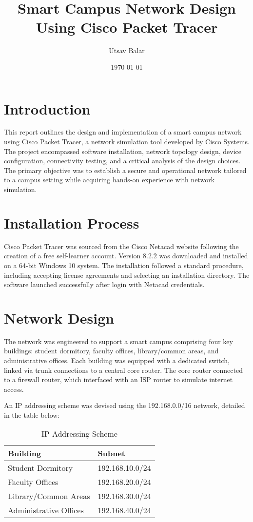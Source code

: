 \documentclass{article}
\title{Smart Campus Network Design Using Cisco Packet Tracer}
\author{Utsav Balar} %
\date{\today} %
\begin{document}
\maketitle

\section{Introduction}
This report outlines the design and implementation of a smart campus network using Cisco Packet Tracer, a network simulation tool developed by Cisco Systems. The project encompassed software installation, network topology design, device configuration, connectivity testing, and a critical analysis of the design choices. The primary objective was to establish a secure and operational network tailored to a campus setting while acquiring hands-on experience with network simulation.

\section{Installation Process}
Cisco Packet Tracer was sourced from the Cisco Netacad website following the creation of a free self-learner account. Version 8.2.2 was downloaded and installed on a 64-bit Windows 10 system. The installation followed a standard procedure, including accepting license agreements and selecting an installation directory. The software launched successfully after login with Netacad credentials.

\section{Network Design}
The network was engineered to support a smart campus comprising four key buildings: student dormitory, faculty offices, library/common areas, and administrative offices. Each building was equipped with a dedicated switch, linked via trunk connections to a central core router. The core router connected to a firewall router, which interfaced with an ISP router to simulate internet access.

An IP addressing scheme was devised using the 192.168.0.0/16 network, detailed in the table below:

\begin{table}[h]
	\centering
	\begin{tabular}{|l|l|}
		\hline
		\textbf{Building}      & \textbf{Subnet} \\
		\hline
		Student Dormitory      & 192.168.10.0/24 \\
		\hline
		Faculty Offices        & 192.168.20.0/24 \\
		\hline
		Library/Common Areas   & 192.168.30.0/24 \\
		\hline
		Administrative Offices & 192.168.40.0/24 \\
		\hline
	\end{tabular}
	\caption{IP Addressing Scheme}
	\label{tab:ip-addressing}
\end{table}
\end{document}
